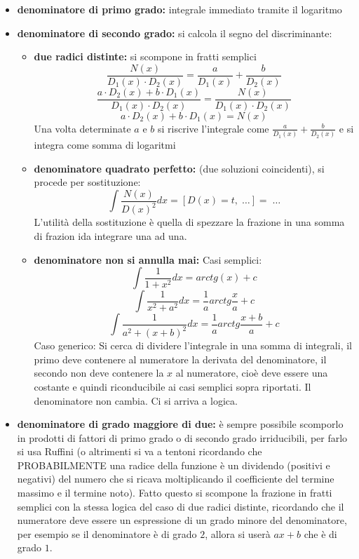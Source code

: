 \documentclass[a4paper, 9pt]{report}
\begin{document}
\begin{itemize}
    \item \textbf{denominatore di primo grado:} integrale immediato tramite il logaritmo
    \item \textbf{denominatore di secondo grado:} si calcola il segno del discriminante:
    \begin{itemize}
        \item \textbf{due radici distinte:} si scompone in fratti semplici
        \[
            \frac{N(x)}{D_1(x) \cdot D_2(x)} = \frac{a}{D_1(x)} + \frac{b}{D_2(x)}
        \]
        \[
            \frac{a \cdot D_2(x) + b \cdot D_1(x)}{D_1(x) \cdot  D_2(x)} = \frac{N(x)}{D_1(x) \cdot D_2(x)}
        \]
        \[
            a \cdot D_2(x) + b \cdot D_1(x)= N(x)
        \]
        Una volta determinate $a$ e $b$ si riscrive l'integrale come $\frac{a}{D_1(x)} + \frac{b}{D_2(x)}$ e si integra come somma di logaritmi
        \item \textbf{denominatore quadrato perfetto:} (due soluzioni coincidenti), si procede per sostituzione:
        \[
            \int \frac{N(x)}{D(x)^2} dx = [D(x) = t, \; \dots] = \; \dots
        \] 
        L'utilità della sostituzione è quella di spezzare la frazione in una somma di frazion ida integrare una ad una.
        \item \textbf{denominatore non si annulla mai:}\newline
        Casi semplici:
        \[
            \int \frac{1}{1 + x^2}dx = arctg (x) +c
        \]
        \[
            \int \frac{1}{x^2 + a^2}dx = \frac{1}{a} arctg \frac{x}{a} +c
        \]
        \[
            \int \frac{1}{a^2 + (x+b)^2}dx = \frac{1}{a} arctg \frac{x+b}{a} +c
        \]
        Caso generico: Si cerca di dividere l'integrale in una somma di integrali, il primo deve contenere al numeratore la derivata del denominatore, il secondo non deve contenere la $x$ al numeratore, cioè deve essere una costante e quindi riconducibile ai casi semplici sopra riportati. Il denominatore non cambia. Ci si arriva a logica. 
    \end{itemize}
    \item \textbf{denominatore di grado maggiore di due:} è sempre possibile scomporlo in prodotti di fattori di primo grado o di secondo grado irriducibili, per farlo si usa Ruffini (o altrimenti si va a tentoni ricordando che PROBABILMENTE una radice della funzione è un dividendo (positivi e negativi) del numero che si ricava moltiplicando il coefficiente del termine massimo e il termine noto).\newline
    Fatto questo si scompone la frazione in fratti semplici con la stessa logica del caso di due radici distinte, ricordando che il numeratore deve essere un espressione di un grado minore del denominatore, per esempio se il denominatore è di grado $2$, allora si userà $ax+b$ che è di grado $1$.
\end{itemize}
\end{document}

